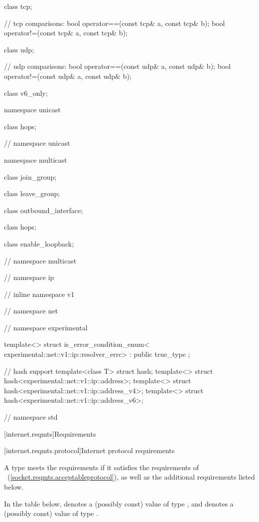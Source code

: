 \begin{codeblock}
{{{{{  class tcp;

  // tcp comparisons:
  bool operator==(const tcp& a, const tcp& b);
  bool operator!=(const tcp& a, const tcp& b);

  class udp;

  // udp comparisons:
  bool operator==(const udp& a, const udp& b);
  bool operator!=(const udp& a, const udp& b);

  class v6_only;

  namespace unicast {

    class hops;

  } // namespace unicast

  namespace multicast {

    class join_group;

    class leave_group;

    class outbound_interface;

    class hops;

    class enable_loopback;

  } // namespace multicast
} // namespace ip
} // inline namespace v1
} // namespace net
} // namespace experimental

  template<> struct is_error_condition_enum<
    experimental::net::v1::ip::resolver_errc>
      : public true_type {};

  // hash support
  template<class T> struct hash;
  template<> struct hash<experimental::net::v1::ip::address>;
  template<> struct hash<experimental::net::v1::ip::address_v4>;
  template<> struct hash<experimental::net::v1::ip::address_v6>;

} // namespace std
\end{codeblock}



[internet.reqmts]{Requirements}


%
[internet.reqmts.protocol]{Internet protocol requirements}

\pnum
A type  meets the  requirements if it satisfies the requirements of ~(\ref{socket.reqmts.acceptableprotocol}), as well as the additional requirements listed below.

\pnum
In the table below,  denotes a (possibly const) value of type , and  denotes a (possibly const) value of type .

